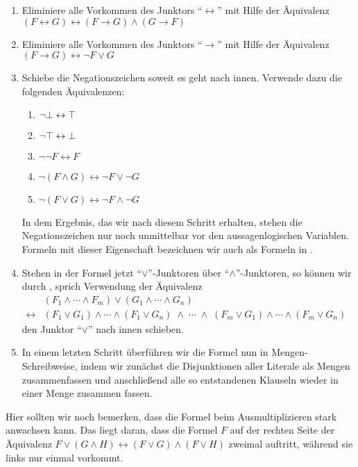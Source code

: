 \begin{enumerate}
\item Eliminiere alle Vorkommen des Junktors ``$\leftrightarrow$'' mit Hilfe der Äquivalenz \\[0.2cm]
      \hspace*{1.3cm} 
      $(F \leftrightarrow G) \leftrightarrow (F \rightarrow G) \wedge (G \rightarrow F)$
\item Eliminiere alle Vorkommen des Junktors ``$\rightarrow$'' mit Hilfe der Äquivalenz \\[0.2cm]
      \hspace*{1.3cm} 
      $(F \rightarrow G) \leftrightarrow \neg F \vee G$
\item Schiebe die Negationszeichen soweit es geht nach innen.  Verwende dazu die folgenden Äquivalenzen:
      \begin{enumerate}
      \item $\neg \bot \leftrightarrow \top$
      \item $\neg \top \leftrightarrow \bot$
      \item $\neg \neg F \leftrightarrow F$
      \item $\neg (F \wedge G) \leftrightarrow  \neg F \vee \neg G$ 
      \item $\neg (F \vee   G) \leftrightarrow  \neg F \wedge \neg G$ 
      \end{enumerate}
      In dem Ergebnis, das wir nach diesem Schritt erhalten, stehen die Negationszeichen
      nur noch unmittelbar vor den aussagenlogischen Variablen.  Formeln mit dieser
      Eigenschaft bezeichnen wir auch als Formeln in .
\item Stehen in der Formel jetzt ``$\vee$''-Junktoren über ``$\wedge$''-Junktoren, so können wir durch
      , sprich Verwendung der Äquivalenz \\[0.2cm]
      \hspace*{1.3cm} 
      $
      \begin{array}{cl}
                      & (F_1 \wedge \cdots \wedge F_m) \vee (G_1 \wedge \cdots \wedge G_n) \\[0.2cm]
      \leftrightarrow & (F_1 \vee G_1) \wedge \cdots \wedge (F_1 \vee G_n) \;\wedge \;\cdots\; \wedge\;
                        (F_m \vee G_1) \wedge \cdots \wedge (F_m \vee G_n)
      \end{array}
      $
      \\[0.2cm]
      den Junktor ``$\vee$'' nach innen schieben.
\item In einem letzten Schritt überführen wir die Formel nun in Mengen-Schreibweise, indem
      wir zunächst die Disjunktionen aller Literale als Mengen zusammenfassen und anschließend
      alle so entstandenen Klauseln wieder in einer Menge zusammen fassen.
\end{enumerate}
Hier sollten wir noch bemerken, dass die Formel beim Ausmultiplizieren stark anwachsen kann.
Das liegt daran, dass die Formel $F$ auf der rechten Seite der Äquivalenz 
$F \vee (G \wedge H) \leftrightarrow (F \vee G) \wedge (F \vee H)$ zweimal auftritt, während sie
links nur einmal vorkommt. 

